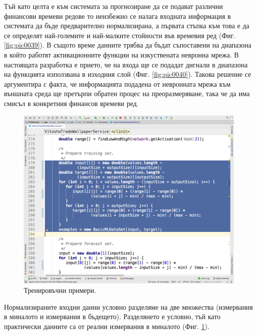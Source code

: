 \documentclass[book,14pt,oneside,openany]{memoir}
\begin{document}
Тъй като целта е към системата за прогнозиране да се подават различни финансови времеви редове то неизбежно се налага входната информация в системата да бъде предварително нормализирана, а първата стъпка към това е да се определят най-големите и най-малките стойности във времевия ред (Фиг. \ref{fig:pic0039}). В същото време данните трябва да бъдат съпоставени на диапазона в който работят активационните функции на изкуствената невронна мрежа. В настоящата разработка е прието, че на входа ще се подадат дигнали в диапазона на функцията използвана в изходния слой (Фиг. \ref{fig:pic0040}). Такова решение се аргументира с факта, че информацията подадена от невронната мрежа към външната среда ще претърпи обратен процес на преоразмеряване, така че да има смисъл в конкретния финансов времеви ред.

\begin{figure}[h]
  \centering
  \includegraphics[height=0.45\pdfpageheight]{./images/pic0041.png}
  \caption{Тренировъчни примери.}
\label{fig:pic0041}
\end{figure}
\FloatBarrier

Нормализираните входни данни условно разделяме на две множества (измервания в миналото и измервания в бъдещето). Разделянето е условно, тъй като практически данните са от реални измервания в миналото (Фиг. \ref{fig:pic0041}).
\end{document}
